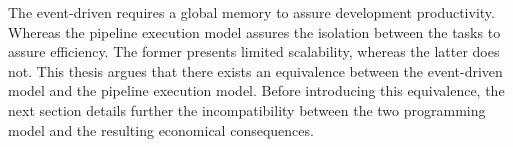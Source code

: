 The event-driven requires a global memory to assure development productivity.
Whereas the pipeline execution model assures the isolation between the tasks to assure efficiency.
The former presents limited scalability, whereas the latter does not.
This thesis argues that there exists an equivalence between the event-driven model and the pipeline execution model.
Before introducing this equivalence, the next section details further the incompatibility between the two programming model and the resulting economical consequences.


\begin{figure}
  \centering{}
\end{figure}




